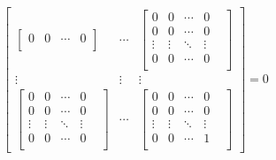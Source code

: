 \documentclass{amsc}          %
\numberwithin{equation}{section} %
\begin{document}
\begin{list}{}
$$\begin{bmatrix}
\begin{bmatrix}
0& 0&\cdots&0\\
\end{bmatrix}&
\cdots&
\begin{bmatrix}
  0& 0&\cdots&0\\
  0& 0&\cdots&0\\
  \vdots&\vdots&\ddots &\vdots& \\
 0& 0&\cdots&0\\
 \end{bmatrix}\\
\vdots&\vdots&\vdots\\
\begin{bmatrix}
  0& 0&\cdots&0\\
  0& 0&\cdots&0\\
  \vdots&\vdots&\ddots &\vdots& \\
   0& 0&\cdots&0\\
   \end{bmatrix}&
\cdots&
\begin{bmatrix}
  0& 0&\cdots&0\\
  0& 0&\cdots&0\\
  \vdots&\vdots&\ddots &\vdots& \\
   0& 0&\cdots&1\\
   \end{bmatrix}
    \end{bmatrix}
    =0$$
 \end{list}
\end{document}
